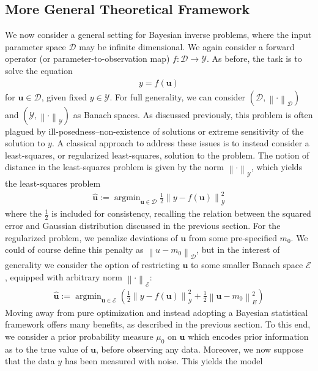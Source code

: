\documentclass[12pt]{article}
\newcommand{\bpar}{\mathbf{u}} %
\newcommand*{\norm}[1]{\left\lVert#1\right\rVert}
\DeclareMathOperator*{\argmin}{argmin}
\begin{document}
\subsection{More General Theoretical Framework}
We now consider a general setting for Bayesian inverse problems, where the input parameter space $\mathcal{D}$ may be infinite dimensional. We again consider a forward operator (or parameter-to-observation 
map) $f: \mathcal{D} \to \mathcal{Y}$. As before, the task is to solve the equation
\begin{align*}
y = f(\bpar)
\end{align*}
for $\bpar \in \mathcal{D}$, given fixed $y \in \mathcal{Y}$. For full generality, we can consider $(\mathcal{D}, \norm{\cdot}_{\mathcal{D}})$ and $(\mathcal{Y},  \norm{\cdot}_{\mathcal{Y}})$ as Banach spaces. As discussed previously, this problem is often plagued by ill-posedness--non-existence 
of solutions or extreme sensitivity of the solution to $y$. A classical approach to address these issues is to instead consider a least-squares, or regularized least-squares, solution to the problem. The notion of distance in the least-squares problem is given by the norm $\norm{\cdot}_{\mathcal{Y}}$, which yields the least-squares problem  
\begin{align*}
\hat{\bpar} := \argmin_{\bpar \in \mathcal{D}} \frac{1}{2} \norm{y - f(\bpar)}_{\mathcal{Y}}^2
\end{align*}
where the $\frac{1}{2}$ is included for consistency, recalling the relation between the squared error and Gaussian distribution discussed in the previous section. For the regularized problem, we penalize deviations 
of $\bpar$ from some pre-specified $m_0$. We could of course define this penalty as $\norm{u - m_0}_{\mathcal{D}}$, but in the interest of generality we consider the option of restricting $\bpar$ to some smaller 
Banach space $\mathcal{E}$, equipped with arbitrary norm $\norm{\cdot}_\mathcal{E}$:
\begin{align*}
\hat{\bpar} := \argmin_{\bpar \in \mathcal{E}} \left(\frac{1}{2} \norm{y - f(\bpar)}_{\mathcal{Y}}^2 + \frac{1}{2} \norm{\bpar - m_0}^2_E\right)
\end{align*}
Moving away from pure optimization and instead adopting a Bayesian statistical framework offers many benefits, as described in the previous section. To this end, we consider a prior probability measure $\mu_0$ on 
$\bpar$ which encodes prior information as to the true value of $\bpar$, before observing any data. Moreover, we now suppose that the data $y$ has been measured with noise. This yields the model
\end{document}
